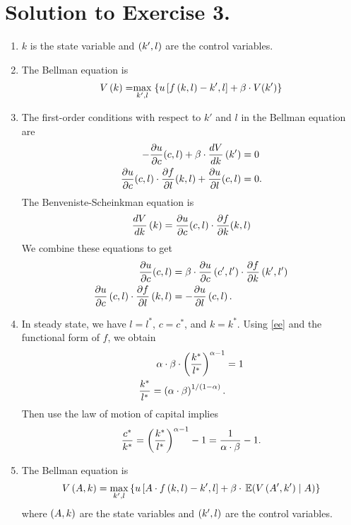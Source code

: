 \documentclass[letterpaper,12pt,leqno]{article}
\begin{document}
\section*{Solution to Exercise 3.}

\begin{enumerate}
\item $k$ is the state variable and $\left( k',l \right) $ are the control variables.
\item The Bellman equation is 
\begin{align*}
V\bp{k} =\underset{k',l}{\max}\bc{u\bs{f\bp{k,l} -k',l} +\b\cdot  V(k')}
\end{align*}
\item The first-order conditions with respect to $k'$ and $l$ in the Bellman equation are
\begin{align*}
-\frac{\partial u}{\partial c}(c,l)+\beta \cdot \frac{d V}{d k}\left( k' \right)& =0 \\
\frac{\partial u}{\partial c}(c,l)\cdot \frac{\partial f}{\partial l}(k,l)+\frac{\partial u}{\partial l}(c,l)&=0 .
\end{align*}
The Benveniste-Scheinkman equation is
\begin{align*}
\frac{d V}{d k}\left( k \right) =\frac{\partial u}{\partial c}(c,l)\cdot \frac{\partial f}{\partial k}(k,l)
\end{align*}
We combine these equations to get
\begin{align}
\frac{\partial u}{\partial c}(c,l) &=\beta \cdot \frac{\partial u}{\partial c}\left( c',l' \right) \cdot \frac{\partial f}{\partial  k}\left( k',l' \right)\label{ee} \\
\frac{\partial u}{\partial c}\left( c,l \right)\cdot \frac{\partial f}{\partial l}\left( k,l \right)&=-\frac{\partial u}{\partial l}\left( c,l \right).
\end{align}

\item In steady state, we have $l=l^{*}$, $c=c^{*}$, and $k=k^{*}$. Using \eqref{ee} and the functional form of $f$, we obtain
\begin{align*}
\alpha \cdot \beta\cdot  \left( \frac{k^{*}}{l^{*}} \right)^{\alpha-1}&=1\\
\frac{k^{*}}{l^{*}}=\left( \alpha\cdot  \beta \right)^{1/\left( 1-\alpha \right)}.
\end{align*}
Then use the law of motion of capital implies 
\begin{align*}
\frac{c^{*}}{k^{*}}=\left( \frac{k^{*}}{l^{*}} \right)^{\alpha-1}-1=\frac{1}{\alpha \cdot \beta}-1.
\end{align*}

\item The Bellman equation is 
\begin{align*}
V\bp{A,k} =\max_{k',l}\bc{u\bs{A\cdot f\bp{k,l}-k',l} +\b \cdot \E{ V\bp{A',k'}\mid A}}
\end{align*}
where $\left( A,k \right) $ are the state variables and $\left( k',l \right) $ are the control variables.


\end{enumerate}
\end{document}
